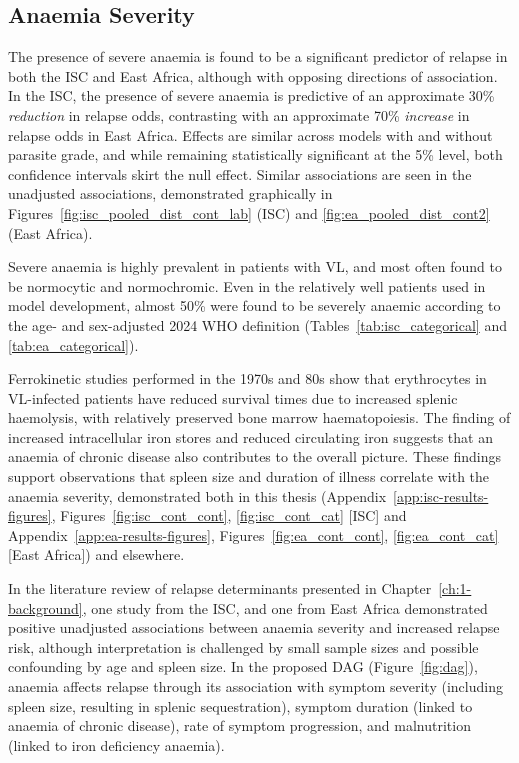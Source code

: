 \subsection{Anaemia Severity}

The presence of severe anaemia is found to be a significant predictor of relapse in both the ISC and East Africa, although with opposing directions of association. In the ISC, the presence of severe anaemia is predictive of an approximate 30\% \textit{reduction} in relapse odds, contrasting with an approximate 70\% \textit{increase} in relapse odds in East Africa. Effects are similar across models with and without parasite grade, and while remaining statistically significant at the 5\% level, both confidence intervals skirt the null effect. Similar associations are seen in the unadjusted associations, demonstrated graphically in Figures~\ref{fig:isc_pooled_dist_cont_lab} (ISC) and \ref{fig:ea_pooled_dist_cont2} (East Africa).

Severe anaemia is highly prevalent in patients with VL, and most often found to be normocytic and normochromic\cite{varma2010, goto2017}. Even in the relatively well patients used in model development, almost 50\% were found to be severely anaemic according to the age- and sex-adjusted 2024 WHO definition\cite{who_haem2024} (Tables~\ref{tab:isc_categorical} and \ref{tab:ea_categorical}).

Ferrokinetic studies performed in the 1970s and 80s show that erythrocytes in VL-infected patients have reduced survival times due to increased splenic haemolysis, with relatively preserved bone marrow haematopoiesis\cite{woodruff1972, volti1980}. The finding of increased intracellular iron stores and reduced circulating iron suggests that an anaemia of chronic disease also contributes to the overall picture\cite{pippard1986}. These findings support observations that spleen size and duration of illness correlate with the anaemia severity, demonstrated both in this thesis (Appendix~\ref{app:isc-results-figures}, Figures~\ref{fig:isc_cont_cont}, \ref{fig:isc_cont_cat} [ISC] and Appendix~\ref{app:ea-results-figures}, Figures~\ref{fig:ea_cont_cont}, \ref{fig:ea_cont_cat} [East Africa]) and elsewhere\cite{varma2010, marwaha1991,goto2017}.

In the literature review of relapse determinants presented in Chapter~\ref{ch:1-background}, one study from the ISC\cite{lucero2015}, and one from East Africa\cite{kennedy2024} demonstrated positive unadjusted associations between anaemia severity and increased relapse risk, although interpretation is challenged by small sample sizes and possible confounding by age and spleen size. In the proposed DAG (Figure~\ref{fig:dag}), anaemia affects relapse through its association with symptom severity (including spleen size, resulting in splenic sequestration), symptom duration (linked to anaemia of chronic disease), rate of symptom progression, and malnutrition (linked to iron deficiency anaemia).

